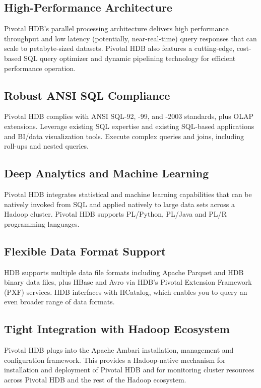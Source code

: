 \documentclass[9pt,twocolumn,twoside]{../../styles/osajnl}
\begin{document}
\subsection{High-Performance Architecture}

Pivotal HDB’s parallel processing architecture delivers high 
performance throughput and low latency (potentially, near-real-time) 
query responses that can scale to petabyte-sized datasets. Pivotal 
HDB also features a cutting-edge, cost-based SQL query optimizer and 
dynamic pipelining technology for efficient performance operation.

\subsection{Robust ANSI SQL Compliance}

Pivotal HDB complies with ANSI SQL-92, -99, and -2003 standards, plus 
OLAP extensions. Leverage existing SQL expertise and existing 
SQL-based applications and BI/data visualization tools. Execute 
complex queries and joins, including roll-ups and nested queries.

\subsection{Deep Analytics and Machine Learning}

Pivotal HDB integrates statistical and machine learning capabilities 
that can be natively invoked from SQL and applied natively to large 
data sets across a Hadoop cluster. Pivotal HDB supports PL/Python, 
PL/Java and PL/R programming languages.

\subsection{Flexible Data Format Support}

HDB supports multiple data file formats including Apache Parquet and 
HDB binary data files, plus HBase and Avro via HDB’s Pivotal 
Extension Framework (PXF) services. HDB interfaces with HCatalog, 
which enables you to query an even broader range of data formats.

\subsection{Tight Integration with Hadoop Ecosystem}

Pivotal HDB plugs into the Apache Ambari installation, management and 
configuration framework. This provides a Hadoop-native mechanism for 
installation and deployment of Pivotal HDB and for monitoring cluster 
resources across Pivotal HDB and the rest of the Hadoop ecosystem.
\end{document}
